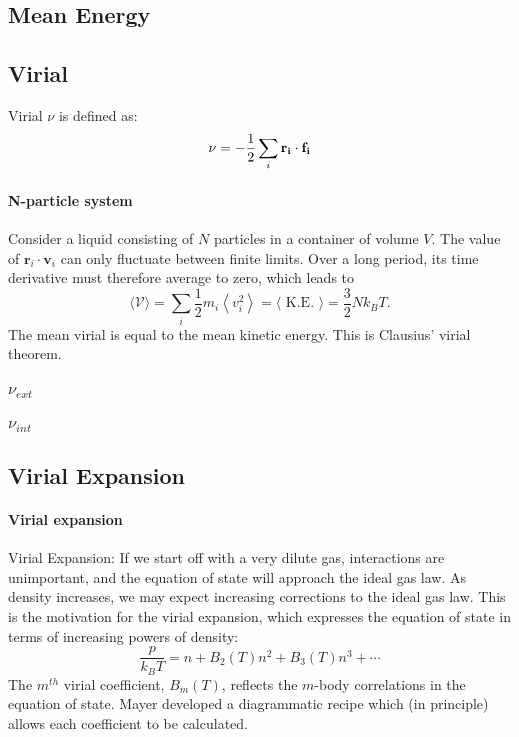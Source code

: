 \documentclass[12pt,a4paper]{article}
\begin{document}
\subsection{Mean Energy}
\subsection{Virial}
Virial $\nu$ is defined as: 
\begin{align*}
    \nu = -\dfrac{1}{2} \sum_i {\vb{r_i}\cdot \vb{f_i}}
\end{align*}
\paragraph*{N-particle system}
Consider a liquid consisting of $N$ particles in a container of volume $V$. The value of $\mathbf{r}_i \cdot \mathbf{v}_i$ can only fluctuate between finite limits. Over a long period, its time derivative must therefore average to zero, which leads to
$$
\langle\mathcal{V}\rangle=\sum_i \frac{1}{2} m_i\left\langle v_i^2\right\rangle=\langle\text { K.E. }\rangle=\frac{3}{2} N k_B T .
$$
The mean virial is equal to the mean kinetic energy. This is Clausius' virial theorem.
\subsubsection{${\nu_{ext}}$}
\subsubsection{${\nu_{int}}$}
\subsection{Virial Expansion}
\paragraph*{Virial expansion}Virial Expansion: If we start off with a very dilute gas, interactions are unimportant, and the equation of state will approach the ideal gas law. As density increases, we may expect increasing corrections to the ideal gas law. This is the motivation for the virial expansion, which expresses the equation of state in terms of increasing powers of density:
$$
\frac{p}{k_B T}=n+B_2(T) n^2+B_3(T) n^3+\cdots
$$
The $m^{t h}$ virial coefficient, $B_m(T)$, reflects the $m$-body correlations in the equation of state. Mayer developed a diagrammatic recipe which (in principle) allows each coefficient to be calculated.
\end{document}
